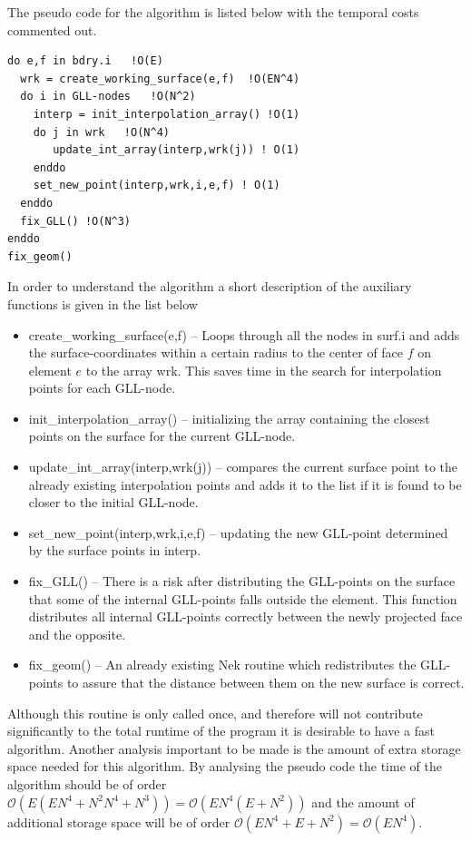 The pseudo code for the algorithm is listed below with the temporal costs commented out.
%
\begingroup
\fontsize{12pt}{14pt}
\begin{lstlisting}[escapechar=|,frame=none]
do e,f in bdry.i   !O(E)
  wrk = create_working_surface(e,f)  !O(EN^4) 
  do i in GLL-nodes   !O(N^2)
    interp = init_interpolation_array() !O(1) 
    do j in wrk   !O(N^4)
       update_int_array(interp,wrk(j)) ! O(1)
    enddo
    set_new_point(interp,wrk,i,e,f) ! O(1)
  enddo
  fix_GLL() !O(N^3)
enddo
fix_geom()
\end{lstlisting}
\endgroup
% 
In order to understand the algorithm a short description of the auxiliary functions is 
given in the list below
\begin{itemize}
    \item create\_working\_surface(e,f) -- Loops through all the nodes in surf.i and adds the 
        surface-coordinates within a certain radius to the center of face $f$ on element $e$ to the array wrk.
        This saves time in the search for interpolation points for each GLL-node.
    \item init\_interpolation\_array() -- initializing the array containing the closest 
        points on the surface for the current GLL-node. 
    \item update\_int\_array(interp,wrk(j)) -- compares the current surface point to the 
        already existing interpolation points and adds it to the list if it is found to 
        be closer to the initial GLL-node.
    \item set\_new\_point(interp,wrk,i,e,f) -- updating the new GLL-point determined by the 
        surface points in interp.
    \item fix\_GLL() -- There is a risk after distributing the GLL-points on the surface that
        some of the internal GLL-points falls outside the element. This function distributes 
        all internal GLL-points correctly between the newly projected face and the opposite.
    \item fix\_geom() -- An already existing Nek routine which redistributes the GLL-points to 
        assure that the distance between them on the new surface is correct.
\end{itemize}

Although this routine is only called once, and therefore will not contribute significantly 
to the total runtime of the program it is desirable to have a fast algorithm. Another analysis
important to be made is the amount of extra storage space needed for this algorithm.
By analysing the pseudo code the time of the algorithm should be of order $\mathcal{O}(E(EN^4+N^2N^4+N^3))=\mathcal{O}(EN^4(E+N^2))$
and the amount of additional storage space will be of order $\mathcal{O}(EN^4+E+N^2)=\mathcal{O}(EN^4)$.


